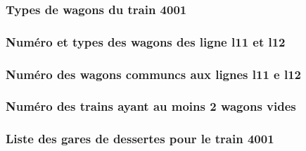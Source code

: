 \subsubsection{Types de wagons du train 4001}
\subsubsection{Numéro et types des wagons des ligne l11 et l12}
\subsubsection{Numéro des wagons communcs aux lignes l11 e l12}
\subsubsection{Numéro des trains ayant au moins 2 wagons vides}
\subsubsection{Liste des gares de dessertes pour le train 4001}
